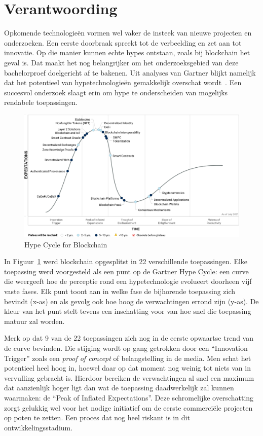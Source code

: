 \section{Verantwoording}
\label{sec:verantwoording}

Opkomende technologieën vormen wel vaker de insteek van nieuwe projecten en onderzoeken. Een eerste doorbraak spreekt tot de verbeelding en zet aan tot innovatie. Op die manier kunnen echte hypes ontstaan, zoals bij blockchain het geval is. Dat maakt het nog belangrijker om het onderzoeksgebied van deze bachelorproef doelgericht af te bakenen. Uit analyses van Gartner blijkt namelijk dat het potentieel van hypetechnologieën gemakkelijk overschat wordt~\autocite{Kietzmann2018}. Een succesvol onderzoek slaagt erin om hype te onderscheiden van mogelijks rendabele toepassingen.

\begin{figure}[H]
	\includegraphics[width=\textwidth]{img/inleiding/gartner-hypecycle.png}
	\caption{\label{fig:gartner}Hype Cycle for Blockchain~\autocite{Gartner2021}}
\end{figure}

\pagebreak

In Figuur~\ref{fig:gartner} werd blockchain opgesplitst in 22 verschillende toepassingen. Elke toepassing werd voorgesteld als een punt op de Gartner Hype Cycle: een curve die weergeeft hoe de perceptie rond een hypetechnologie evolueert doorheen vijf vaste fases. Elk punt toont aan in welke fase de bijhorende toepassing zich bevindt (x-as) en als gevolg ook hoe hoog de verwachtingen errond zijn (y-as). De kleur van het punt stelt tevens een inschatting voor van hoe snel die toepassing matuur zal worden. 

Merk op dat 9 van de 22 toepassingen zich nog in de eerste opwaartse trend van de curve bevinden.
Die stijging wordt op gang getrokken door  een ``Innovation Trigger'' zoals een \textit{proof of concept} of belangstelling in de media. Men schat het potentieel heel hoog in, hoewel daar op dat moment nog weinig tot niets van in vervulling gebracht is. Hierdoor bereiken de verwachtingen al snel een maximum dat aanzienlijk hoger ligt dan wat de toepassing daadwerkelijk zal kunnen waarmaken: de ``Peak of Inflated Expectations''. Deze schromelijke overschatting zorgt gelukkig wel voor het nodige initiatief om de eerste commerciële projecten op poten te zetten. Een proces dat nog heel riskant is in dit ontwikkelingsstadium.

